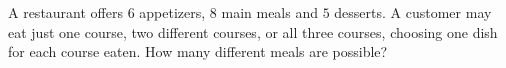 A restaurant offers $6$ appetizers, $8$ main meals and $5$ desserts. A customer may eat just one course, two different courses, or all three courses, choosing one dish for each course eaten. How many different meals are possible?
